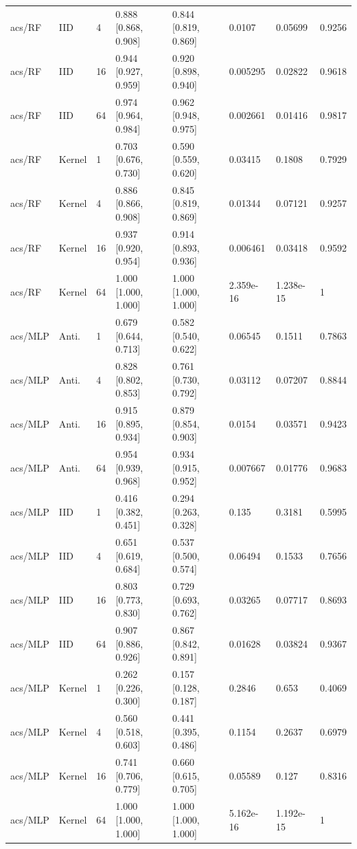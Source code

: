 \begin{tabular}{llllllll}
acs/RF & IID & 4 & 0.888 [0.868, 0.908] & 0.844 [0.819, 0.869] & 0.0107 & 0.05699 & 0.9256 \\
acs/RF & IID & 16 & 0.944 [0.927, 0.959] & 0.920 [0.898, 0.940] & 0.005295 & 0.02822 & 0.9618 \\
acs/RF & IID & 64 & 0.974 [0.964, 0.984] & 0.962 [0.948, 0.975] & 0.002661 & 0.01416 & 0.9817 \\
acs/RF & Kernel & 1 & 0.703 [0.676, 0.730] & 0.590 [0.559, 0.620] & 0.03415 & 0.1808 & 0.7929 \\
acs/RF & Kernel & 4 & 0.886 [0.866, 0.908] & 0.845 [0.819, 0.869] & 0.01344 & 0.07121 & 0.9257 \\
acs/RF & Kernel & 16 & 0.937 [0.920, 0.954] & 0.914 [0.893, 0.936] & 0.006461 & 0.03418 & 0.9592 \\
acs/RF & Kernel & 64 & 1.000 [1.000, 1.000] & 1.000 [1.000, 1.000] & 2.359e-16 & 1.238e-15 & 1 \\
acs/MLP & Anti. & 1 & 0.679 [0.644, 0.713] & 0.582 [0.540, 0.622] & 0.06545 & 0.1511 & 0.7863 \\
acs/MLP & Anti. & 4 & 0.828 [0.802, 0.853] & 0.761 [0.730, 0.792] & 0.03112 & 0.07207 & 0.8844 \\
acs/MLP & Anti. & 16 & 0.915 [0.895, 0.934] & 0.879 [0.854, 0.903] & 0.0154 & 0.03571 & 0.9423 \\
acs/MLP & Anti. & 64 & 0.954 [0.939, 0.968] & 0.934 [0.915, 0.952] & 0.007667 & 0.01776 & 0.9683 \\
acs/MLP & IID & 1 & 0.416 [0.382, 0.451] & 0.294 [0.263, 0.328] & 0.135 & 0.3181 & 0.5995 \\
acs/MLP & IID & 4 & 0.651 [0.619, 0.684] & 0.537 [0.500, 0.574] & 0.06494 & 0.1533 & 0.7656 \\
acs/MLP & IID & 16 & 0.803 [0.773, 0.830] & 0.729 [0.693, 0.762] & 0.03265 & 0.07717 & 0.8693 \\
acs/MLP & IID & 64 & 0.907 [0.886, 0.926] & 0.867 [0.842, 0.891] & 0.01628 & 0.03824 & 0.9367 \\
acs/MLP & Kernel & 1 & 0.262 [0.226, 0.300] & 0.157 [0.128, 0.187] & 0.2846 & 0.653 & 0.4069 \\
acs/MLP & Kernel & 4 & 0.560 [0.518, 0.603] & 0.441 [0.395, 0.486] & 0.1154 & 0.2637 & 0.6979 \\
acs/MLP & Kernel & 16 & 0.741 [0.706, 0.779] & 0.660 [0.615, 0.705] & 0.05589 & 0.127 & 0.8316 \\
acs/MLP & Kernel & 64 & 1.000 [1.000, 1.000] & 1.000 [1.000, 1.000] & 5.162e-16 & 1.192e-15 & 1 \\
\bottomrule
\end{tabular}

\endgroup
